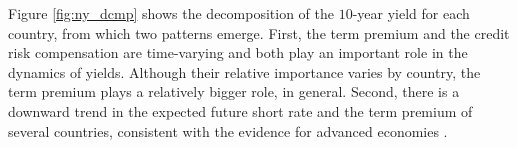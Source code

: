 {%



Figure \ref{fig:ny_dcmp} shows the decomposition of the \(10\)-year yield for each country, from which two patterns emerge. 
First, the term premium and the credit risk compensation are time-varying and both play an important role in the dynamics of yields.
Although their relative importance varies by country, %
the term premium plays a relatively bigger role, in general.
Second, there is a downward trend in the expected future short rate %
and the term premium of several countries, consistent with the evidence for advanced economies \citep{Wright:2011,ACDM:2019}.




}
